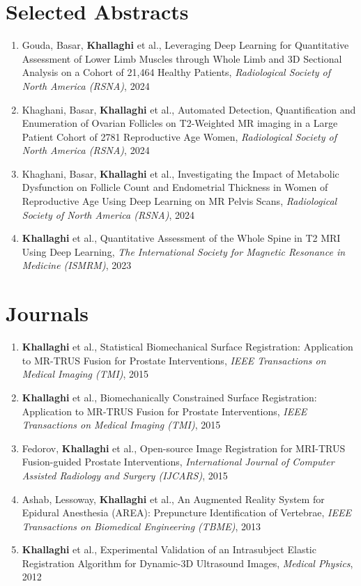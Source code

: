 \documentclass[letterpaper,11pt]{article}
\newcommand{\publicationItem}[4]{
  \item\small{
    {#1}{ et al., #2}{, \textit{#3}}{, #4}
  }
}
\newcommand{\publicationSubheadingListStart}{\begin{enumerate}[leftmargin=*]}
\newcommand{\publicationSubheadingListEnd}{\end{enumerate}}
\newcommand{\publicationSubItem}[4]{\publicationItem{#1}{#2}{#3}{#4}\vspace{-4pt}}
\begin{document}
\section{Selected Abstracts}
\publicationSubheadingListStart
  \publicationSubItem{Gouda, Basar, \textbf{Khallaghi}}
  {Leveraging Deep Learning for Quantitative Assessment of Lower Limb Muscles through Whole Limb and 3D Sectional Analysis on a Cohort of 21,464 Healthy Patients}
  {Radiological Society of North America (RSNA)}{2024}
  \publicationSubItem{Khaghani, Basar, \textbf{Khallaghi}}
  {Automated Detection, Quantification and Enumeration of Ovarian Follicles on T2-Weighted MR imaging in a Large Patient Cohort of 2781 Reproductive Age Women}
  {Radiological Society of North America (RSNA)}{2024}
  \publicationSubItem{Khaghani, Basar, \textbf{Khallaghi}}
  {Investigating the Impact of Metabolic Dysfunction on Follicle Count and Endometrial Thickness in Women of Reproductive Age Using Deep Learning on MR Pelvis Scans}
  {Radiological Society of North America (RSNA)}{2024}
  \publicationSubItem{\textbf{Khallaghi}}
  {Quantitative Assessment of the Whole Spine in T2 MRI Using Deep Learning}
  {The International Society for Magnetic Resonance in Medicine (ISMRM)}{2023}
\publicationSubheadingListEnd

\section{Journals}
  \publicationSubheadingListStart
    \publicationSubItem{\textbf{Khallaghi}}
      {Statistical Biomechanical Surface Registration: Application to MR-TRUS Fusion for Prostate Interventions}
      {IEEE Transactions on Medical Imaging (TMI)}{2015}
    \publicationSubItem{\textbf{Khallaghi}}
      {Biomechanically Constrained Surface Registration: Application to MR-TRUS Fusion for Prostate Interventions}
      {IEEE Transactions on Medical Imaging (TMI)}{2015}
    \publicationSubItem {Fedorov, \textbf{Khallaghi}}
      {Open-source Image Registration for MRI-TRUS Fusion-guided Prostate Interventions}
      {International Journal of Computer Assisted Radiology and Surgery (IJCARS)}{2015}
    \publicationSubItem{Ashab, Lessoway, \textbf{Khallaghi}}
      {An Augmented Reality System for Epidural Anesthesia (AREA): Prepuncture Identification of Vertebrae}
      {IEEE Transactions on Biomedical Engineering (TBME)}{2013}
    \publicationSubItem{\textbf{Khallaghi}}
      {Experimental Validation of an Intrasubject Elastic Registration Algorithm for Dynamic-3D Ultrasound Images}
      {Medical Physics}{2012}
  \publicationSubheadingListEnd
\end{document}
